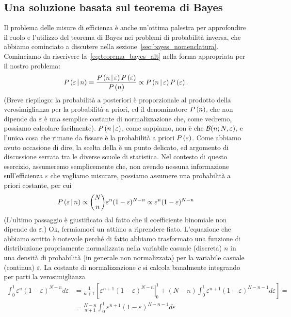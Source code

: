 \subsection{Una soluzione basata sul teorema di Bayes}

\danger%
Il problema delle misure di efficienza è anche un'ottima palestra per
approfondire il ruolo e l'utilizzo del teorema di Bayes nei problemi di
probabilità inversa, che abbiamo cominciato a discutere nella
sezione~\ref{sec:bayes_nomenclatura}.
Cominciamo da riscrivere la~\ref{eq:teorema_bayes_alt} nella forma appropriata
per il nostro problema:
\begin{align}
  \displaystyle P\left(\varepsilon \,|\, n\right) =
  \frac{\displaystyle P\left(n \,|\, \varepsilon\right) \displaystyle P\left(\varepsilon\right)}{\displaystyle P\left(n\right)} \propto
  \displaystyle P\left(n \,|\, \varepsilon\right) \displaystyle P\left(\varepsilon\right).
\end{align}
(Breve riepilogo: la probabilità a posteriori è proporzionale al prodotto
della verosimiglianza per la probabilità a priori, ed il denominatore
$\displaystyle P\left(n\right)$, che non dipende da $\varepsilon$ è una semplice costante di
normalizzazione che, come vedremo, possiamo calcolare facilmente).
$\displaystyle P\left(n \,|\, \varepsilon\right)$, come sappiamo, non è che
$\binomialpdf[N, \varepsilon]{n}$, e l'unica cosa che rimane da fissare è
la probabilità a priori $\displaystyle P\left(\varepsilon\right)$. Come abbiamo avuto occasione di
dire, la scelta della  è un punto delicato, ed argomento di
discussione serrata tra le diverse scuole di statistica. Nel contesto di questo
esercizio, assumeremo semplicemente che, non avendo nessuna informazione
sull'efficienza $\varepsilon$ che vogliamo misurare, possiamo assumere
una probabilità a priori costante, per cui
\begin{align*}
  \displaystyle P\left(\varepsilon \,|\, n\right) \propto
  \binom{N}{n}\varepsilon^n (1 - \varepsilon)^{N - n} \propto
  \varepsilon^n (1 - \varepsilon)^{N - n}
\end{align*}
(L'ultimo passaggio è giustificato dal fatto che il coefficiente binomiale
non dipende da $\varepsilon$.)
Ok, fermiamoci un attimo a riprendere fiato. L'equazione che abbiamo scritto
è notevole perché di fatto abbiamo trasformato una funzione di
distribuzione propriamente normalizzata nella variabile casuale (discreta) $n$
in una densità di probabilità (in generale non normalizzata) per la
variabile casuale (continua) $\varepsilon$. La costante di normalizzazione $c$
si calcola banalmente integrando per parti la verosimiglianza
\begin{align*}
\int_0^1 \varepsilon^n (1 - \varepsilon)^{N-n} d\varepsilon & =
\frac{1}{n+1} \left[
  \left. \varepsilon^{n+1} (1 - \varepsilon)^{N-n}\right|_0^1 + (N-n)
  \int_0^1 \varepsilon^{n+1} (1 - \varepsilon)^{N-n-1} d\varepsilon
  \right] =\\
& = \frac{N-n}{n+1}
\int_0^1 \varepsilon^{n+1} (1 - \varepsilon)^{N-n-1} d\varepsilon
\end{align*}
